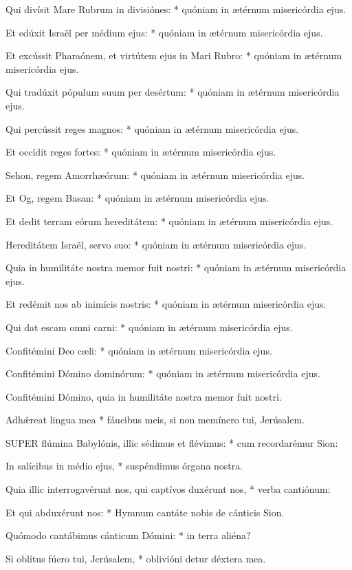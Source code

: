 Qui divísit Mare Rubrum in divisiónes: * quóniam in ætérnum misericórdia ejus.

Et edúxit Israël per médium ejus: * quóniam in ætérnum misericórdia ejus.

Et excússit Pharaónem, et virtútem ejus in Mari Rubro: * quóniam in ætérnum misericórdia ejus.

Qui tradúxit pópulum suum per desértum: * quóniam in ætérnum misericórdia ejus.

Qui percússit reges magnos: * quóniam in ætérnum misericórdia ejus.

Et occídit reges fortes: * quóniam in ætérnum misericórdia ejus.

Sehon, regem Amorrhæórum: * quóniam in ætérnum misericórdia ejus.

Et Og, regem Basan: * quóniam in ætérnum misericórdia ejus.

Et dedit terram eórum hereditátem: * quóniam in ætérnum misericórdia ejus.

Hereditátem Israël, servo suo: * quóniam in ætérnum misericórdia ejus.

Quia in humilitáte nostra memor fuit nostri: * quóniam in ætérnum misericórdia ejus.

Et redémit nos ab inimícis nostris: * quóniam in ætérnum misericórdia ejus.

Qui dat escam omni carni: * quóniam in ætérnum misericórdia ejus.

Confitémini Deo cæli: * quóniam in ætérnum misericórdia ejus.

Confitémini Dómino dominórum: * quóniam in ætérnum misericórdia ejus.

 Confitémini Dómino, quia in humilitáte nostra memor fuit nostri.

 Adhǽreat lingua mea * fáucibus meis, si non memínero tui, Jerúsalem.


\lettrine[lines=2]{S}{UPER} flúmina Babylónis, illic sédimus et flévimus: * cum recordarémur Sion:

In salícibus in médio ejus, * suspéndimus órgana nostra.

Quia illic interrogavérunt nos, qui captívos duxérunt nos, * verba cantiónum:

Et qui abduxérunt nos: * Hymnum cantáte nobis de cánticis Sion.

Quómodo cantábimus cánticum Dómini: * in terra aliéna?

Si oblítus fúero tui, Jerúsalem, * oblivióni detur déxtera mea.

